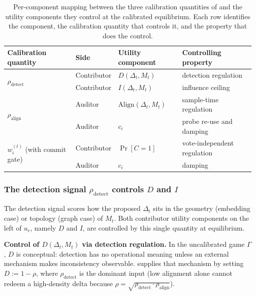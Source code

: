 \begin{table}[h]
\centering
\small
\caption{Per-component mapping between the three calibration quantities
of \system and the utility components they control at the calibrated
equilibrium. Each row identifies the component, the calibration quantity
that controls it, and the property that does the control.}
\label{tab:utility-mapping}
\begin{tabular}{@{}llll@{}}
\toprule
Calibration quantity & Side & Utility component & Controlling property \\
\midrule
\multirow{2}{*}{$\rho_{\text{detect}}$}
 & Contributor & $D(\Delta_t,M_t)$ & detection regulation \\
 & Contributor & $I(\Delta_t,M_t)$ & influence ceiling \\
\midrule
\multirow{2}{*}{$\rho_{\text{align}}$}
 & Auditor     & $\mathrm{Align}(\Delta_t,M_t)$ & sample-time regulation \\
 & Auditor     & $c_i$ & probe re-use and damping \\
\midrule
\multirow{2}{*}{$w_i^{(t)}$ (with commit gate)}
 & Contributor & $\Pr[C{=}1]$ & vote-independent regulation \\
 & Auditor     & $c_i$ &  damping \\
\bottomrule
\end{tabular}
\end{table}

\subsubsection{The detection signal \texorpdfstring{$\rho_{\text{detect}}$}{rho\_detect} controls \texorpdfstring{$D$}{D} and \texorpdfstring{$I$}{I}}

The detection signal scores how the proposed $\Delta_t$ sits in the
geometry (embedding case) or topology (graph case) of $M_t$. Both
contributor utility components on the left of $u_c$, namely $D$ and
$I$, are controlled by this single quantity at equilibrium.

\textbf{Control of $D(\Delta_t,M_t)$ via detection regulation.}
In the uncalibrated game $\Gamma$, $D$ is conceptual: detection has no
operational meaning unless an external mechanism makes inconsistency
observable. \system supplies that mechanism by setting
$D := 1 - \rho$, where $\rho_{\text{detect}}$ is the dominant input
(low alignment alone cannot redeem a high-density delta because
$\rho = \sqrt{\rho_{\text{detect}}\cdot\rho_{\text{align}}}$).

